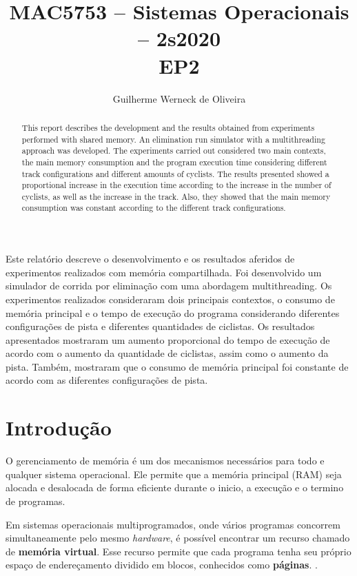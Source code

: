 \documentclass[12pt]{article}
\title{MAC5753 -- Sistemas Operacionais -- 2s2020\\ EP2}
\author{Guilherme Werneck de Oliveira\inst{1}}
\begin{document}
\maketitle

\begin{abstract}
  This report describes the development and the results obtained from experiments performed with shared memory. An elimination run simulator with a multithreading approach was developed. The experiments carried out considered two main contexts, the main memory consumption and the program execution time considering different track configurations and different amounts of cyclists. The results presented showed a proportional increase in the execution time according to the increase in the number of cyclists, as well as the increase in the track. Also, they showed that the main memory consumption was constant according to the different track configurations.
\end{abstract}

\begin{resumo}
  Este relatório descreve o desenvolvimento e os resultados aferidos de experimentos realizados com memória compartilhada. Foi desenvolvido um simulador de corrida por eliminação com uma abordagem multithreading. Os experimentos realizados consideraram dois principais contextos, o consumo de memória principal e o tempo de execução do programa considerando diferentes configurações de pista e diferentes quantidades de ciclistas. Os resultados apresentados mostraram um aumento proporcional do tempo de execução de acordo com o aumento da quantidade de ciclistas, assim como o aumento da pista. Também, mostraram que o consumo de memória principal foi constante de acordo com as diferentes configurações de pista.
\end{resumo}


\section{Introdução}

O gerenciamento de memória é um dos mecanismos necessários para todo e qualquer sistema operacional. Ele permite que a memória principal (RAM) seja alocada e desalocada de forma eficiente durante o inicio, a execução e o termino de programas.

Em sistemas operacionais multiprogramados, onde vários programas concorrem simultaneamente pelo mesmo \textit{hardware}, é possível encontrar um recurso chamado de \textbf{memória virtual}. Esse recurso permite que cada programa tenha seu próprio espaço de endereçamento dividido em blocos, conhecidos como \textbf{páginas}. \cite{tanenbaum:16}.
\end{document}
